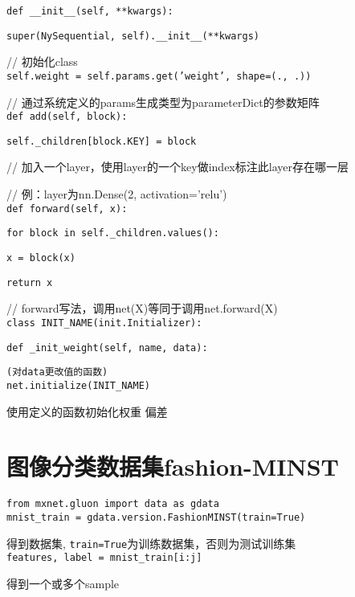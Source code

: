 \documentclass[UTF8]{ctexart}
\begin{document}
  \texttt{def \_\_init\_\_(self, **kwargs):}

  \quad \texttt{super(NySequential, self).\_\_init\_\_(**kwargs)}

  // 初始化class\\

  \quad \texttt{self.weight = self.params.get('weight', shape=(., .))}

  // 通过系统定义的params生成类型为parameterDict的参数矩阵\\

  \texttt{def add(self, block):}

  \quad \texttt{self.\_children[block.KEY] = block}

  // 加入一个layer，使用layer的一个key做index标注此layer存在哪一层

  // 例：layer为nn.Dense(2, activation='relu')\\

  \texttt{def forward(self, x):}

  \quad \texttt{for block in self.\_children.values():}

  \quad \quad \texttt{x = block(x)}

  \quad \quad \texttt{return x}

  // forward写法，调用net(X)等同于调用net.forward(X)\\
\texttt{class INIT\_NAME(init.Initializer):}

  \texttt{def \_init\_weight(self, name, data):}

  \quad \texttt{(对data更改值的函数)}\\
\texttt{net.initialize(INIT\_NAME)}

  使用定义的函数初始化权重 偏差

\section{图像分类数据集fashion-MINST}
\noindent \texttt{from mxnet.gluon import data as gdata}\\
\texttt{mnist\_train = gdata.version.FashionMINST(train=True)} 

  得到数据集, \texttt{train=True}为训练数据集，否则为测试训练集\\
\texttt{features, label = mnist\_train[i:j]}
  
  得到一个或多个sample
  
\end{document}
